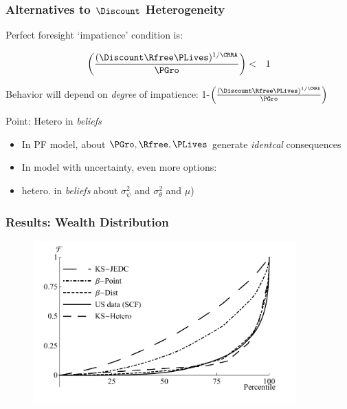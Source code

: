 \documentclass{beamer}
\begin{document}
\begin{frame}\frametitle{Alternatives to $\Discount$ Heterogeneity}

Perfect foresight `impatience' condition is:

\begin{eqnarray}
  \left(\frac{(\Discount \Rfree \PLives)^{1/\CRRA}}{\PGro}\right) & < & 1
\end{eqnarray}

Behavior will depend on {\it degree} of impatience: 1-$\left(\frac{(\Discount \Rfree \PLives)^{1/\CRRA}}{\PGro}\right)$

Point:  Hetero in {\it beliefs}
\begin{itemize}
\item In PF model, about ${\PGro,\Rfree,\PLives}$ generate {\it identcal} consequences
\item In model with uncertainty, even more options:
\bi 
\item hetero. in {\it beliefs} about $\sigma^{2}_{\psi}$ and $\sigma^{2}_{\theta}$ and $\mu$)
\ei
\end{itemize}



\end{frame}

\begin{frame}
\frametitle{{Results: Wealth Distribution}}

\begin{figure}
\centering
\includegraphics[width=0.9\textwidth]{../Figures/CumWLevSCFCastanedaAndDistSevenNoAggShockPlot.pdf}
\label{CumWLevSCFCastanedaAndDistSevenNoAggShockPlot}
\end{figure}

\end{frame}
\end{document}
